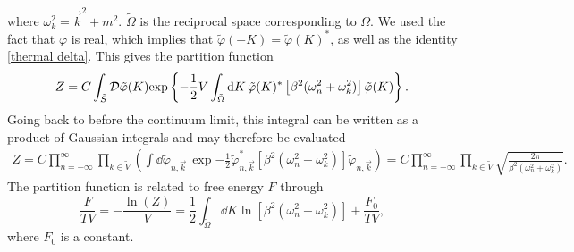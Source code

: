 %
where $\omega_k^2 = \vec k^2 + m^2$.
$\tilde \Omega$ is the reciprocal space corresponding to $\Omega$.
We used the fact that $\varphi$ is real, which implies that $\tilde \varphi(-K) = \tilde \varphi(K)^*$, as well as the identity \autoref{thermal delta}.
This gives the partition function 
%
\begin{equation}
    Z = C \int_{\tilde S} \mathcal D \tilde \varphi(K) 
    \text{exp} \left\{ 
        -  \frac{1}{2} V \int_{\tilde \Omega} \text{d} K \, 
        \tilde \varphi(K)^* \left[\beta^2 (\omega_n^2+ \omega_k^2)\right] \tilde \varphi(K)
     \right\}.
\end{equation}
%
Going back to before the continuum limit, this integral can be written as a product of Gaussian integrals and may therefore be evaluated
%
\begin{align*}
    Z = C \prod_{n=-\infty}^\infty \prod_{k \in \tilde V}
    \left(
        \int \dd \tilde \varphi_{n, \vec k} \,
        \exp{
            - \frac{1}{2} \tilde \varphi_{n, \vec k}^*
            \left[\beta^2 (\omega_n^2+ \omega_k^2)\right] 
            \tilde \varphi_{n, \vec k}
            }
    \right)
    = 
    C \prod_{n=-\infty}^\infty \prod_{k \in \tilde V} 
    \sqrt{\frac{2 \pi}{\beta^2 (\omega_n^2 + \omega_k^2)}}.
\end{align*}
%
The partition function is related to free energy $F$ through
%
\begin{equation}
    \label{result free scalar 1}
    \frac{F}{T V}= - \frac{\ln(Z)}{V} = \frac{1}{2} \int_{\tilde \Omega} \dd K \ln[\beta^2(\omega_n^2 + \omega_k^2)] + \frac{F_0}{TV},
\end{equation}
%
where $F_0$ is a constant.

